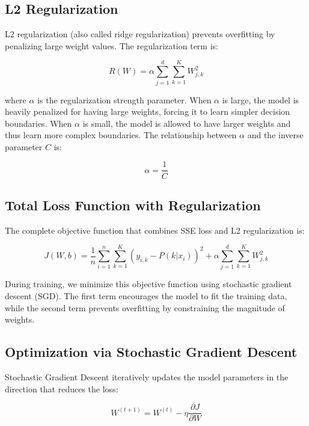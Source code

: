 \documentclass[12pt]{article}
\begin{document}
\subsection{L2 Regularization}

L2 regularization (also called ridge regularization) prevents overfitting by penalizing large weight values. The regularization term is:

\begin{equation}
R(W) = \alpha \sum_{j=1}^{d} \sum_{k=1}^{K} W_{j,k}^2
\end{equation}

where $\alpha$ is the regularization strength parameter. When $\alpha$ is large, the model is heavily penalized for having large weights, forcing it to learn simpler decision boundaries. When $\alpha$ is small, the model is allowed to have larger weights and thus learn more complex boundaries. The relationship between $\alpha$ and the inverse parameter $C$ is:

\begin{equation}
\alpha = \frac{1}{C}
\end{equation}

\subsection{Total Loss Function with Regularization}

The complete objective function that combines SSE loss and L2 regularization is:

\begin{equation}
J(W, b) = \frac{1}{n} \sum_{i=1}^{n} \sum_{k=1}^{K} (y_{i,k} - P(k|x_i))^2 + \alpha \sum_{j=1}^{d} \sum_{k=1}^{K} W_{j,k}^2
\end{equation}

During training, we minimize this objective function using stochastic gradient descent (SGD). The first term encourages the model to fit the training data, while the second term prevents overfitting by constraining the magnitude of weights.

\subsection{Optimization via Stochastic Gradient Descent}

Stochastic Gradient Descent iteratively updates the model parameters in the direction that reduces the loss:

\begin{equation}
W^{(t+1)} = W^{(t)} - \eta \frac{\partial J}{\partial W}
\end{equation}
\end{document}
